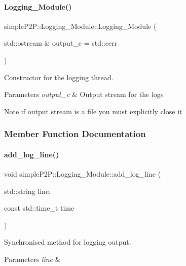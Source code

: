 \paragraph{\texorpdfstring{Logging\+\_\+\+Module()}{Logging\_Module()}}
{\footnotesize\ttfamily simple\+P2\+P\+::\+Logging\+\_\+\+Module\+::\+Logging\+\_\+\+Module (\begin{DoxyParamCaption}\item[{std\+::ostream \&}]{output\+\_\+c = {\ttfamily std\+:\+:cerr} }\end{DoxyParamCaption})}



Constructor for the logging thread. 


\begin{DoxyParams}{Parameters}
{\em output\+\_\+c} & Output stream for the logs \\
\hline
\end{DoxyParams}
\begin{DoxyNote}{Note}
if output stream is a file you must explicitly close it 
\end{DoxyNote}


\subsubsection{Member Function Documentation}
\mbox{\label{classsimpleP2P_1_1Logging__Module_a5f1eb6d6c66d406f02ae4093cc7657ec}} 
\paragraph{\texorpdfstring{add\+\_\+log\+\_\+line()}{add\_log\_line()}}
{\footnotesize\ttfamily void simple\+P2\+P\+::\+Logging\+\_\+\+Module\+::add\+\_\+log\+\_\+line (\begin{DoxyParamCaption}\item[{std\+::string}]{line,  }\item[{const std\+::time\+\_\+t}]{time }\end{DoxyParamCaption})}



Synchronised method for logging output. 


\begin{DoxyParams}{Parameters}
{\em line} & \\
\hline
\end{DoxyParams}
\mbox{\label{classsimpleP2P_1_1Logging__Module_a57e92e151320fd7c811689d831498b6a}} 
